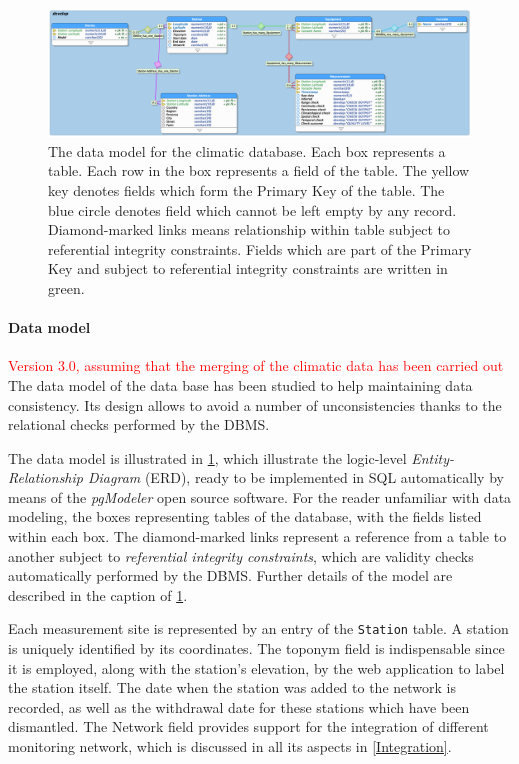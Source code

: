 \documentclass[authoryear,preprint,review,12pt]{elsarticle}
\begin{document}
\begin{figure}
	\includegraphics[scale=.26]{ERD}
	\caption{The data model for the climatic database. Each box represents a table. Each row in the box represents a field of the table. The yellow key denotes fields which form the Primary Key of the table. The blue circle denotes field which cannot be left empty by any record. Diamond-marked links means relationship within table subject to referential integrity constraints. Fields which are part of the Primary Key and subject to referential integrity constraints are written in green.}
	\label{ERD}
\end{figure}


\paragraph{Data model}\textcolor{Red}{Version 3.0, assuming that the merging of the climatic data has been carried out} The data model of the data base has been studied to help maintaining data consistency. Its design allows to avoid a number of unconsistencies thanks to the relational checks performed by the DBMS. 

The data model is illustrated in  \cref{ERD}, which illustrate the logic-level \emph{Entity-Relationship Diagram} (ERD), ready to be implemented in SQL automatically by means of the \emph{pgModeler} \citep{pgmodeler} open source software. For the reader unfamiliar with data modeling, the boxes representing tables of the database, with the fields listed within each box. The diamond-marked links represent a reference from a table to another subject to \emph{referential integrity constraints}, which are validity checks automatically performed by the DBMS. Further details of the model are described in the caption of \cref{ERD}.

Each measurement site is represented by an entry of the \texttt{Station} table. A station is uniquely identified by its coordinates. The toponym field is indispensable since it is employed, along with the station's elevation, by the web application to label the station itself. The date when the station was added to the network is recorded, as well as the withdrawal date for these stations which have been dismantled. The Network field provides support for the integration of different monitoring network, which is discussed in all its aspects in \cref{Integration}.
\end{document}
